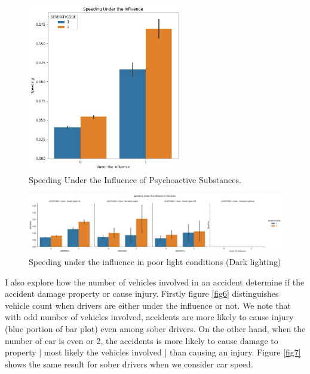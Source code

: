 \documentclass[a4paper,12pt]{article}
\begin{document}
\begin{figure}[H]
	\centering
	\includegraphics[width=0.6\textwidth]{un_sp_sev.jpg}
	\caption{Speeding Under the Influence of Psychoactive Substances.}
	\label{fig4}
\end{figure}

\begin{figure}[H]
	\centering
	\includegraphics[width=1.1\textwidth]{un_sp_sev_lig.jpg}
	\caption{Speeding under the influence in poor light conditions (Dark lighting)}
	\label{fig5}
\end{figure}


I also explore how the number of vehicles involved in an accident determine if the accident damage property or cause injury. Firstly figure \ref{fig6} distinguishes vehicle count when drivers are either under the influence or not. We note that with odd number of vehicles involved, accidents are more likely to cause injury (blue portion of bar plot) even among sober drivers. On the other hand, when the number of car is even or 2, the accidents is more likely to cause damage to property | most likely the vehicles involved | than causing an injury. Figure \ref{fig7} shows the same result for sober drivers when we consider car speed.\\
\end{document}
